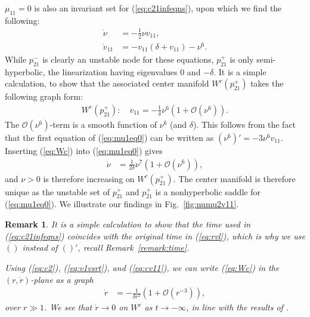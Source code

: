 \documentclass[reqno,12pt]{amsart}
\newcommand{\eqlab}[1]{\label{eq:#1}}
\renewcommand{\eqref}[1]{(\ref{eq:#1})}
\newcommand{\figref}[1]{Fig.~\ref{fig:#1}}
\newcommand{\remref}[1]{Remark~\ref{remark:#1}}
\newcommand{\remlab}[1]{\label{remark:#1}}
\newtheorem{remark}[theorem]{Remark}
\numberwithin{equation}{section}
\begin{document}
  $\mu_{11}=0$ is also an invariant set for \eqref{c21infeqns}, upon which we find the following:
  \begin{equation}\eqlab{mu1eq0}
  \begin{aligned}
   \dot \nu &= - \frac12 \nu v_{11},\\
 \dot v_{11} &= -v_{11}(\delta+v_{11})-\nu^6.
  \end{aligned}
  \end{equation}
  While $p_{21}^-$ is clearly an unstable node for these equations,
$p_{21}^+$ is only semi-hyperbolic, the linearization having eigenvalues $0$ and $-\delta$. It is a simple calculation, to show that the associated center manifold $W^c(p_{21}^+)$ takes the following graph form:
\begin{align}
 W^c(p_{21}^+):\quad v_{11} = -\frac{1}{\delta} \nu^6(1+\mathcal O(\nu^6)).\eqlab{Wc}
\end{align}
The $\mathcal O(\nu^6)$-term is a smooth function of $\nu^6$ (and $\delta$). This follows from the fact that the first equation of \eqref{mu1eq0} can be written as $(\nu^6)' = -3 \nu^6 v_{11}$. Inserting \eqref{Wc} into \eqref{mu1eq0}
gives
\begin{align*}
 \dot \nu &=\frac{1}{2\delta}\nu^7(1+\mathcal O(\nu^6)),
\end{align*}
and $\nu>0$ is therefore increasing on $W^c(p_{21}^+)$.
The center manifold is therefore unique as the unstable set of $p_{21}^+$ and 
$p_{21}^+$ is a nonhyperbolic saddle for \eqref{mu1eq0}.  
  We illustrate our findings in \figref{numu2v11}.
\begin{remark}\remlab{Wc}
It is a simple calculation to show that the time used in \eqref{c21infeqns} coincides with the original time in \eqref{rvl}, which is why we use $\dot{()}$ instead of $()'$, recall \remref{time}. 

Using \eqref{c2}, \eqref{v1vsrt}, and \eqref{cv11}, we can write \eqref{Wc} in the $(r,\dot r)$-plane as a graph
\begin{align*}
 \dot r &=-\frac{1}{\delta r^2}(1+\mathcal O(r^{-3})),
\end{align*}
over $r\gg 1$. We see that $\dot r\rightarrow 0$ on $W^c$ as $t\rightarrow -\infty$, in line with the results of \cite[Proposition 3.1]{margheri2014a}.
\end{remark}
\end{document}
